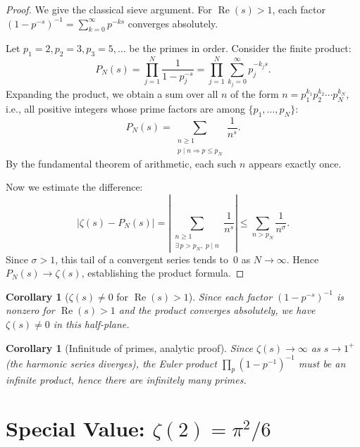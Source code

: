\documentclass[12pt,a4paper,openany]{book}
\theoremstyle{definition}
\theoremstyle{plain}
\newtheorem{corollary}[definition]{Corollary}
\theoremstyle{remark}
\newcommand{\abs}[1]{\left|#1\right|}
\begin{document}
\begin{proof}
We give the classical sieve argument. For $\operatorname{Re}(s) > 1$,
each factor $(1 - p^{-s})^{-1} = \sum_{k=0}^{\infty} p^{-ks}$ converges
absolutely.

Let $p_1 = 2, p_2 = 3, p_3 = 5, \ldots$ be the primes in order. Consider
the finite product:
\[
  P_N(s) = \prod_{j=1}^{N} \frac{1}{1 - p_j^{-s}}
  = \prod_{j=1}^{N} \sum_{k_j=0}^{\infty} p_j^{-k_j s}.
\]
Expanding the product, we obtain a sum over all $n$ of the form
$n = p_1^{k_1} p_2^{k_2} \cdots p_N^{k_N}$, i.e., all positive integers whose
prime factors are among $\{p_1, \ldots, p_N\}$:
\[
  P_N(s) = \sum_{\substack{n \geq 1 \\ p \mid n \Rightarrow p \leq p_N}}
  \frac{1}{n^s}.
\]
By the fundamental theorem of arithmetic, each such $n$ appears exactly once.

Now we estimate the difference:
\[
  \abs{\zeta(s) - P_N(s)}
  = \left\lvert \sum_{\substack{n \geq 1 \\ \exists\, p > p_N,\; p \mid n}}
    \frac{1}{n^s} \right\rvert
  \leq \sum_{n > p_N} \frac{1}{n^{\sigma}}.
\]
Since $\sigma > 1$, this tail of a convergent series tends to~$0$ as
$N \to \infty$. Hence $P_N(s) \to \zeta(s)$, establishing the product formula.
\end{proof}

\begin{corollary}[$\zeta(s) \neq 0$ for $\operatorname{Re}(s)>1$]
\label{cor:zeta-nonzero}
Since each factor $(1-p^{-s})^{-1}$ is nonzero for $\operatorname{Re}(s) > 1$
and the product converges absolutely, we have $\zeta(s) \neq 0$ in this
half-plane.
\end{corollary}

\begin{corollary}[Infinitude of primes, analytic proof]
\label{cor:infinitude-analytic}
Since $\zeta(s) \to \infty$ as $s \to 1^+$ (the harmonic series diverges), the
Euler product $\prod_p (1-p^{-1})^{-1}$ must be an infinite product, hence there
are infinitely many primes.
\end{corollary}


\section{Special Value: \texorpdfstring{$\zeta(2) = \pi^2/6$}{zeta(2) = pi squared over 6}}
\label{sec:zeta-2}
\end{document}
